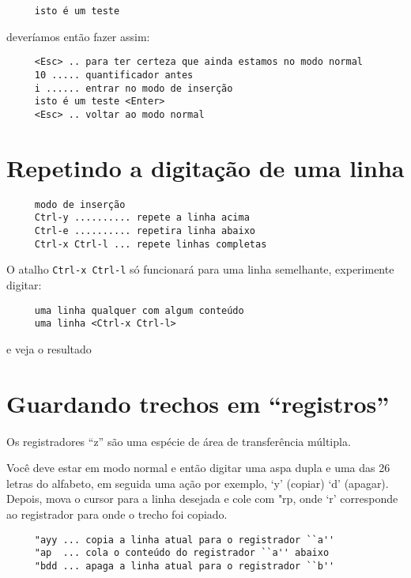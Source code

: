 \begin{verbatim}
     isto é um teste
\end{verbatim}

deveríamos então fazer assim:
   
\begin{verbatim}
     <Esc> .. para ter certeza que ainda estamos no modo normal
     10 ..... quantificador antes
     i ...... entrar no modo de inserção
     isto é um teste <Enter>
     <Esc> .. voltar ao modo normal
\end{verbatim}

\section{Repetindo a digitação de uma linha }

\begin{verbatim}
     modo de inserção
     Ctrl-y .......... repete a linha acima 
     Ctrl-e .......... repetira linha abaixo 
     Ctrl-x Ctrl-l ... repete linhas completas
\end{verbatim}


O atalho {\tt Ctrl-x Ctrl-l} só funcionará para uma 
linha semelhante, experimente digitar:

\begin{verbatim}
     uma linha qualquer com algum conteúdo
     uma linha <Ctrl-x Ctrl-l>
\end{verbatim}

e veja o resultado

\section{Guardando trechos em ``registros''}
\label{sec:Guardando trechos em ``registros''}

Os registradores ``z'' são uma espécie de área de transferência múltipla.

Você deve estar em modo normal e então digitar uma aspa dupla e uma
das 26 letras do alfabeto, em seguida uma ação por exemplo, `y'
(copiar) `d' (apagar). Depois, mova o cursor para a linha
desejada e cole com "rp, onde `r' corresponde ao
registrador para onde o trecho foi copiado.

\begin{verbatim}
     "ayy ... copia a linha atual para o registrador ``a''
     "ap  ... cola o conteúdo do registrador ``a'' abaixo
     "bdd ... apaga a linha atual para o registrador ``b''
\end{verbatim}


